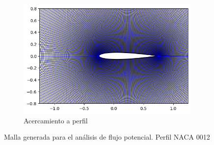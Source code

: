 \documentclass[letterpaper, openright, 12pt]{book}
\begin{document}
\begin{figure}[htbp!]
\begin{subfigure}[c]{0.48\textwidth}
            \includegraphics[keepaspectratio, width=0.99\textwidth]
                {./img/potential_flow_mesh_close}
            \caption{Acercamiento a perfil}
            \label{fig:potential_flow_mesh_close}
        \end{subfigure}
        \caption{Malla generada para el análisis de flujo potencial. Perfil
            NACA 0012}
        \label{fig:potential_flow_mesh}
    \end{figure}
\end{document}
